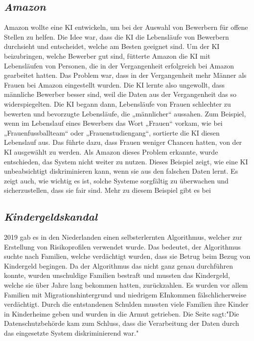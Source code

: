 \documentclass{article}
\begin{document}
\subsection{\textit{Amazon}}\label{6.1}
Amazon wollte eine KI entwickeln, um bei der Auswahl von Bewerbern für offene Stellen zu helfen. Die Idee war, dass die KI die Lebensläufe von Bewerbern durchsieht und entscheidet, welche am Besten geeignet sind. Um der KI beizubringen, welche Bewerber gut sind, fütterte Amazon die KI mit Lebensläufen von Personen, die in der Vergangenheit erfolgreich bei Amazon gearbeitet hatten. Das Problem war, dass in der Vergangenheit mehr Männer als Frauen bei Amazon eingestellt wurden. Die KI lernte also ungewollt, dass männliche Bewerber besser sind, weil die Daten aus der Vergangenheit das so widerspiegelten. Die KI begann dann, Lebensläufe von Frauen schlechter zu bewerten und bevorzugte Lebensläufe, die „männlicher“ aussahen. Zum Beispiel, wenn im Lebenslauf eines Bewerbers das Wort „Frauen“ vorkam, wie bei „Frauenfussballteam“ oder „Frauenstudiengang“, sortierte die KI diesen Lebenslauf aus. Das führte dazu, dass Frauen weniger Chancen hatten, von der KI ausgewählt zu werden. Als Amazon dieses Problem erkannte, wurde entschieden, das System nicht weiter zu nutzen. Dieses Beispiel zeigt, wie eine KI unbeabsichtigt diskriminieren kann, wenn sie aus den falschen Daten lernt. Es zeigt auch, wie wichtig es ist, solche Systeme sorgfältig zu überwachen und sicherzustellen, dass sie fair sind. Mehr zu diesem Beispiel gibt es bei \citep{AmazonAlgorithmus}

\subsection{\textit{Kindergeldskandal}}
2019 gab es in den Niederlanden einen selbsterlernten Algorithmus, welcher zur Erstellung von Risikoprofilen verwendet wurde. Das bedeutet, der Algorithmus suchte nach Familien, welche verdächtigt wurden, dass sie Betrug beim Bezug von Kindergeld begingen. Da der Algorithmus das nicht ganz genau durchführen konnte, wurden unschuldige Familien bestraft und mussten das Kindergeld, welche sie über Jahre lang bekommen hatten, zurückzahlen. Es wurden vor allem Familien mit Migrationshintergrund und niedrigem EInkommen fälschlicherweise verdächtigt. Durch die entstandenen Schulden mussten viele Familien ihre Kinder in Kinderheime geben und wurden in die Armut getrieben. Die Seite \citep{DiskriminierendeAlgorithmen} sagt:"Die Datenschutzbehörde kam zum Schluss, dass die Verarbeitung der Daten durch das eingesetzte System diskriminierend war."
\end{document}
